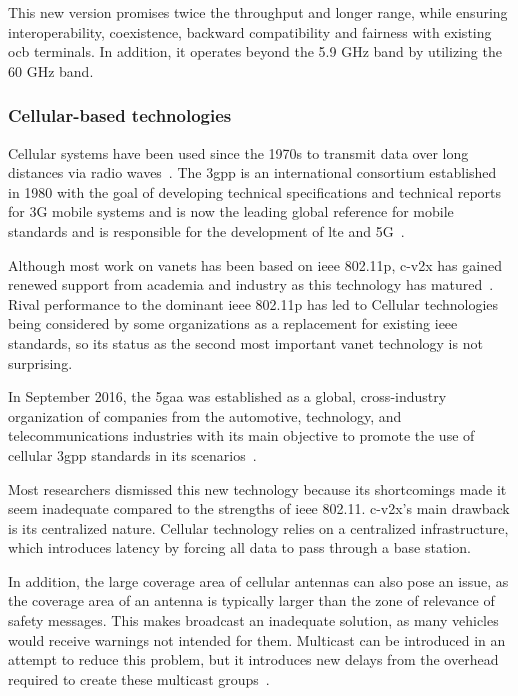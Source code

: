 This new version promises twice the throughput and longer range, while ensuring interoperability, coexistence, backward compatibility and fairness with existing \gls{ocb} terminals. In addition, it operates beyond the 5.9 GHz band by utilizing the 60 GHz band.


\subsubsection{Cellular-based technologies}
Cellular systems have been used since the 1970s to transmit data over long distances via radio waves~\cite{anwer_survey_2014}. The \gls{3gpp} is an international consortium established in 1980 with the goal of developing technical specifications and technical reports for 3G mobile systems and is now the leading global reference for mobile standards and is responsible for the development of \gls{lte} and 5G~\cite{noauthor_3gpp_nodate}.

Although most work on \glspl{vanet} has been based on \gls{ieee} 802.11p, \gls{c-v2x} has gained renewed support from academia and industry as this technology has matured~\cite{gyawali_challenges_2021}. Rival performance to the dominant \gls{ieee} 802.11p has led to Cellular technologies being considered by some organizations as a replacement for existing \gls{ieee} standards, so its status as the second most important \gls{vanet} technology is not surprising.

In September 2016, the \gls{5gaa} was established as a global, cross-industry organization of companies from the automotive, technology, and telecommunications industries with its main objective to promote the use of cellular \gls{3gpp} standards in \gls{its} scenarios~\cite{noauthor_5gaa_nodate}.

Most researchers dismissed this new technology because its shortcomings made it seem inadequate compared to the strengths of \gls{ieee} 802.11. \gls{c-v2x}'s main drawback is its centralized nature. Cellular technology relies on a centralized infrastructure, which introduces latency by forcing all data to pass through a base station.

In addition, the large coverage area of cellular antennas can also pose an issue, as the coverage area of an antenna is typically larger than the zone of relevance of safety messages. This makes broadcast an inadequate solution, as many vehicles would receive warnings not intended for them. Multicast can be introduced in an attempt to reduce this problem, but it introduces new delays from the overhead required to create these multicast groups~\cite{gyawali_challenges_2021}.

